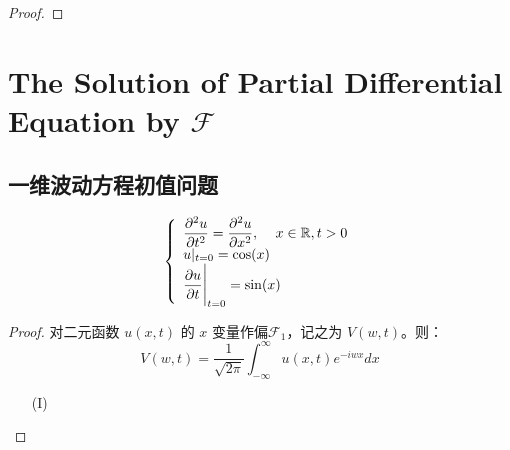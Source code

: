 \documentclass[linespread=1.5,openany]{book}%
\theoremstyle{plain}
\begin{document}
{{{\begin{proof}
					\end{proof}
					
					
				}
				
				\chapter{The Solution of Partial Differential Equation by $\mathcal{F}$ }
				{
					\section{一维波动方程初值问题}
					\[\left\{\begin{array}{l}
						
						\large \displaystyle\frac{\partial^2 u}{\partial t^2}= \frac{\partial^2 u}{\partial x^2}, \quad x \in \mathbb{R}, t > 0\\
						\large \displaystyle u|_{t=0}=  \cos(x)\\
						\large \displaystyle \frac{\partial u}{\partial t}\bigg|_{t=0} = \sin(x)
					\end{array}\right.\]
					\begin{proof}
						对二元函数 \(u(x, t)\) 的 \(x\) 变量作偏$\mathcal{F}_1$，记之为 \(V(w, t)\)。则：\[
						V(w, t) = \frac{1}{\sqrt{2\pi}} \int_{-\infty}^{\infty} u(x, t) e^{-iwx} dx\]
						\begin{itemize}
							\item[(I)]
							

\end{itemize}
\end{proof}}}}
\end{document}
